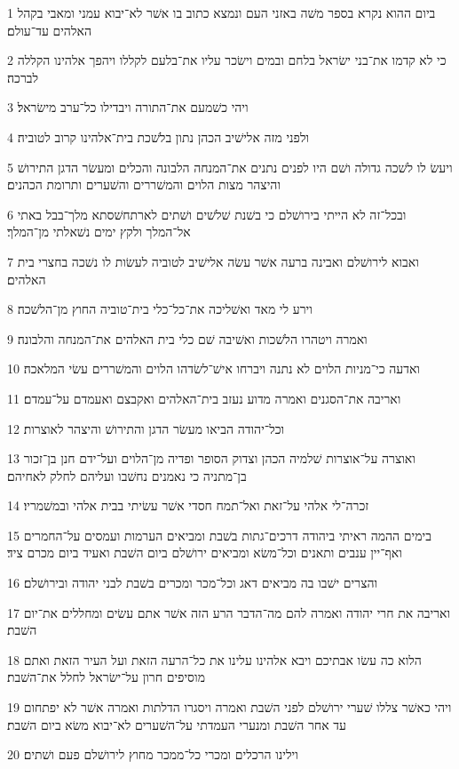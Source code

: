\par 1 ביום ההוא נקרא בספר משׁה באזני העם ונמצא כתוב בו אשׁר לא־יבוא עמני ומאבי בקהל האלהים עד־עולם׃
\par 2 כי לא קדמו את־בני ישׂראל בלחם ובמים וישׂכר עליו את־בלעם לקללו ויהפך אלהינו הקללה לברכה׃
\par 3 ויהי כשׁמעם את־התורה ויבדילו כל־ערב מישׂראל׃
\par 4 ולפני מזה אלישׁיב הכהן נתון בלשׁכת בית־אלהינו קרוב לטוביה׃
\par 5 ויעשׂ לו לשׁכה גדולה ושׁם היו לפנים נתנים את־המנחה הלבונה והכלים ומעשׂר הדגן התירושׁ והיצהר מצות הלוים והמשׁררים והשׁערים ותרומת הכהנים׃
\par 6 ובכל־זה לא הייתי בירושׁלם כי בשׁנת שׁלשׁים ושׁתים לארתחשׁסתא מלך־בבל באתי אל־המלך ולקץ ימים נשׁאלתי מן־המלך׃
\par 7 ואבוא לירושׁלם ואבינה ברעה אשׁר עשׂה אלישׁיב לטוביה לעשׂות לו נשׁכה בחצרי בית האלהים׃
\par 8 וירע לי מאד ואשׁליכה את־כל־כלי בית־טוביה החוץ מן־הלשׁכה׃
\par 9 ואמרה ויטהרו הלשׁכות ואשׁיבה שׁם כלי בית האלהים את־המנחה והלבונה׃
\par 10 ואדעה כי־מניות הלוים לא נתנה ויברחו אישׁ־לשׂדהו הלוים והמשׁררים עשׂי המלאכה׃
\par 11 ואריבה את־הסגנים ואמרה מדוע נעזב בית־האלהים ואקבצם ואעמדם על־עמדם׃
\par 12 וכל־יהודה הביאו מעשׂר הדגן והתירושׁ והיצהר לאוצרות׃
\par 13 ואוצרה על־אוצרות שׁלמיה הכהן וצדוק הסופר ופדיה מן־הלוים ועל־ידם חנן בן־זכור בן־מתניה כי נאמנים נחשׁבו ועליהם לחלק לאחיהם׃
\par 14 זכרה־לי אלהי על־זאת ואל־תמח חסדי אשׁר עשׂיתי בבית אלהי ובמשׁמריו׃
\par 15 בימים ההמה ראיתי ביהודה דרכים־גתות בשׁבת ומביאים הערמות ועמסים על־החמרים ואף־יין ענבים ותאנים וכל־משׂא ומביאים ירושׁלם ביום השׁבת ואעיד ביום מכרם ציד׃
\par 16 והצרים ישׁבו בה מביאים דאג וכל־מכר ומכרים בשׁבת לבני יהודה ובירושׁלם׃
\par 17 ואריבה את חרי יהודה ואמרה להם מה־הדבר הרע הזה אשׁר אתם עשׂים ומחללים את־יום השׁבת׃
\par 18 הלוא כה עשׂו אבתיכם ויבא אלהינו עלינו את כל־הרעה הזאת ועל העיר הזאת ואתם מוסיפים חרון על־ישׂראל לחלל את־השׁבת׃
\par 19 ויהי כאשׁר צללו שׁערי ירושׁלם לפני השׁבת ואמרה ויסגרו הדלתות ואמרה אשׁר לא יפתחום עד אחר השׁבת ומנערי העמדתי על־השׁערים לא־יבוא משׂא ביום השׁבת׃
\par 20 וילינו הרכלים ומכרי כל־ממכר מחוץ לירושׁלם פעם ושׁתים׃

